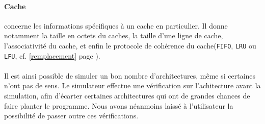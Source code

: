 \paragraph{Cache} concerne les informations spécifiques à un cache en particulier. Il donne notamment la taille en octets du caches, la taille d'une ligne de cache, l'associativité du cache, et enfin le protocole de cohérence du cache(\verb?FIFO?, \verb?LRU? ou \verb?LFU?, cf. \ref{remplacement} page \pageref{remplacement}).

\paragraph{}
Il est ainsi possible de simuler un bon nombre d'architectures, même si certaines n'ont pas de sens. Le simulateur effectue une vérification sur l'achitecture avant la simulation, afin d'écarter certaines architectures qui ont de grandes chances de faire planter le programme. Nous avons néanmoins laissé à l'utilisateur la possibilité de passer outre ces vérifications.


